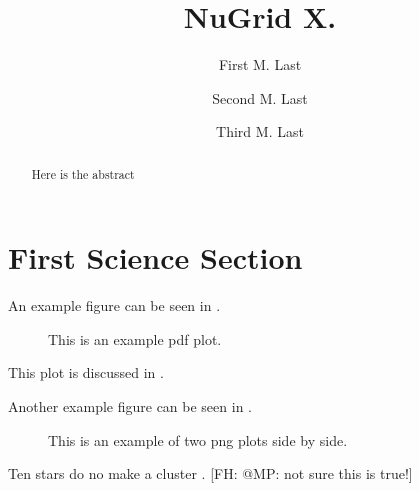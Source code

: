 \documentclass[twocolumn]{aastex61}
\newcommand{\shortcomment}[3]{\textcolor{#1}{[#2: #3]}}
\newcommand{\fhcom}[1]{\shortcomment{PineGreen}{FH}{#1}}
\begin{document}
\title{NuGrid X. }
\author{First M. Last}

\author{Second  M. Last}

\author{Third M. Last}




\begin{abstract}
  Here is the abstract
\end{abstract}

\keywords{}

\section{First Science Section}\label{s.science1} 


An example figure can be seen in .
\begin{figure}[ht!]
\caption{\label{fig:general}
This is an example pdf plot.}
\end{figure}

This plot is discussed in \citet{lau:12}.

Another example figure can be seen in .
\begin{figure*}[ht!]
\caption{This is an example of two png plots side by side.
  \label{fig:two-plotexample}}
\end{figure*}

Ten stars do no make a cluster \citep{2001A&A...369..574V}.
\fhcom{@MP: not sure this is true!}






\end{document}
